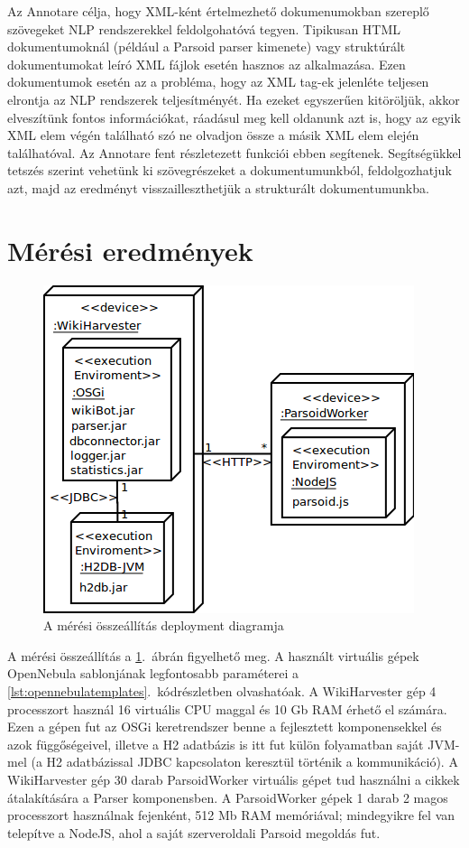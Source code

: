 Az Annotare célja, hogy XML-ként értelmezhető dokumenumokban szereplő szövegeket NLP rendszerekkel feldolgohatóvá tegyen. Tipikusan HTML dokumentumoknál (például a Parsoid parser kimenete) vagy struktúrált dokumentumokat leíró XML fájlok esetén hasznos az alkalmazása. Ezen dokumentumok esetén az a probléma, hogy az XML tag-ek jelenléte teljesen elrontja az NLP rendszerek teljesítményét. Ha ezeket egyszerűen kitöröljük, akkor elveszítünk fontos információkat, ráadásul meg kell oldanunk azt is, hogy az egyik XML elem végén található szó ne olvadjon össze a másik XML elem elején találhatóval. Az Annotare fent részletezett funkciói ebben segítenek. Segítségükkel tetszés szerint vehetünk ki szövegrészeket a dokumentumunkból, feldolgozhatjuk azt, majd az eredményt visszailleszthetjük a strukturált dokumentumunkba.


\section{Mérési eredmények}
\label{sec:measurement}

\begin{figure}[htp]
\centering
\includegraphics[scale=0.5]{img/deploymentdiagram}
\caption{A mérési összeállítás deployment diagramja}
\label{fig:deploymentdiagram}
\end{figure}

A mérési összeállítás a \ref{fig:deploymentdiagram}.~ábrán figyelhető meg. A használt virtuális gépek OpenNebula sablonjának legfontosabb paraméterei a \ref{lst:opennebulatemplates}.~kódrészletben olvashatóak. A WikiHarvester gép 4 processzort használ 16 virtuális CPU maggal és 10 Gb RAM érhető el számára. Ezen a gépen fut az OSGi keretrendszer benne a fejlesztett komponensekkel és azok függőségeivel, illetve a H2 adatbázis is itt fut külön folyamatban saját JVM-mel (a H2 adatbázissal JDBC kapcsolaton keresztül történik a kommunikáció). A WikiHarvester gép 30 darab ParsoidWorker virtuális gépet tud használni a cikkek átalakítására a Parser komponensben. A ParsoidWorker gépek 1 darab 2 magos processzort használnak fejenként, 512 Mb RAM memóriával; mindegyikre fel van telepítve a NodeJS, ahol a saját szerveroldali Parsoid megoldás fut.

